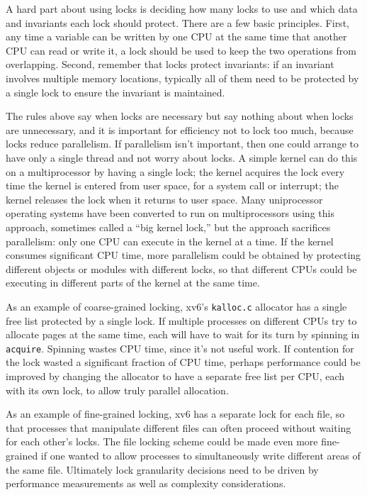 A hard part about using locks is deciding how many locks
to use and which data and invariants each lock should protect.
There are a few basic principles.
First, any time a variable can be written by one CPU
at the same time that another CPU can read or write it,
a lock should be used to keep the two
operations from overlapping.
Second, remember that locks protect invariants:
if an invariant involves multiple memory locations,
typically all of them need to be protected
by a single lock to ensure the invariant is maintained.

The rules above say when locks are necessary but say nothing about when locks
are unnecessary, and it is important for efficiency not to lock too much,
because locks reduce parallelism.  If parallelism isn't important, then one
could arrange to have only a single thread and not worry about locks.  A simple
kernel can do this on a multiprocessor by having a single lock;
the kernel acquires the lock every time the kernel is entered
from user space, for a system call or interrupt;
the kernel releases the lock when it returns to user space.
Many uniprocessor operating systems have been converted to
run on multiprocessors using this approach, sometimes called a ``big
kernel lock,'' but the approach sacrifices parallelism: only one
CPU can execute in the kernel at a time.  If the kernel consumes
significant CPU time, more parallelism could be obtained by
protecting different objects or modules with different locks,
so that different CPUs could be
executing in different parts of the kernel at the same time.

As an example of coarse-grained locking, xv6's \lstinline{kalloc.c}
allocator has a single free list protected by a single lock. If
multiple processes on different CPUs try to allocate pages at the same
time, each will have to wait for its turn by spinning in {\tt
  acquire}. Spinning wastes CPU time, since it's not useful work.
If contention for the lock wasted a significant fraction of CPU time,
perhaps performance could be improved by changing the allocator 
to have a separate free list per CPU, each with its own lock, to allow truly
parallel allocation.

As an example of fine-grained locking, xv6 has a separate lock for
each file, so that processes that manipulate different files can often
proceed without waiting for each other's locks. The file locking
scheme could be made even more fine-grained if one wanted to allow
processes to simultaneously write different areas of the same file.
Ultimately lock granularity decisions need to be driven by performance
measurements as well as complexity considerations.

